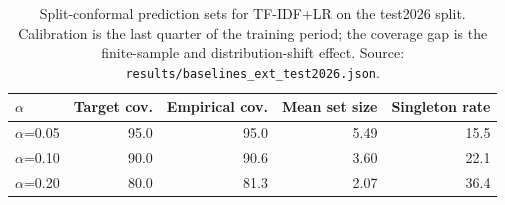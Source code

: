 \begin{table}[t]\centering
\caption{Split-conformal prediction sets for TF-IDF+LR on the test2026 split. Calibration is the last quarter of the training period; the coverage gap is the finite-sample and distribution-shift effect. Source: \texttt{results/baselines\_ext\_test2026.json}.}
\label{tab:conformal-test2026}
\begin{tabular}{lrrrr}
\toprule
$\alpha$ & Target cov. & Empirical cov. & Mean set size & Singleton rate \\
\midrule
$\alpha$=0.05 & 95.0 & 95.0 & 5.49 & 15.5 \\
$\alpha$=0.10 & 90.0 & 90.6 & 3.60 & 22.1 \\
$\alpha$=0.20 & 80.0 & 81.3 & 2.07 & 36.4 \\
\bottomrule
\end{tabular}
\end{table}

